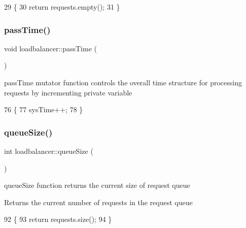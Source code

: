 \begin{DoxyCode}
29                            \{
30     \textcolor{keywordflow}{return} requests.empty();
31 \}
\end{DoxyCode}
\mbox{\label{classloadbalancer_a4d793bdf97c72b577ada58a774c3bddb}} 
\subsubsection{\texorpdfstring{pass\+Time()}{passTime()}}
{\footnotesize\ttfamily void loadbalancer\+::pass\+Time (\begin{DoxyParamCaption}{ }\end{DoxyParamCaption})}

pass\+Time mutator function controls the overall time structure for processing requests by incrementing private variable 
\begin{DoxyCode}
76                             \{
77     sysTime++;
78 \}
\end{DoxyCode}
\mbox{\label{classloadbalancer_a9716bb001708f3c7792df0d1c8689ab0}} 
\subsubsection{\texorpdfstring{queue\+Size()}{queueSize()}}
{\footnotesize\ttfamily int loadbalancer\+::queue\+Size (\begin{DoxyParamCaption}{ }\end{DoxyParamCaption})}

queue\+Size function returns the current size of request queue \begin{DoxyReturn}{Returns}
the current number of requests in the request queue 
\end{DoxyReturn}

\begin{DoxyCode}
92                             \{
93     \textcolor{keywordflow}{return} requests.size();
94 \}
\end{DoxyCode}
\mbox{\label{classloadbalancer_abaa9c95170cbf3c1c3041b17d31df4c0}} 
